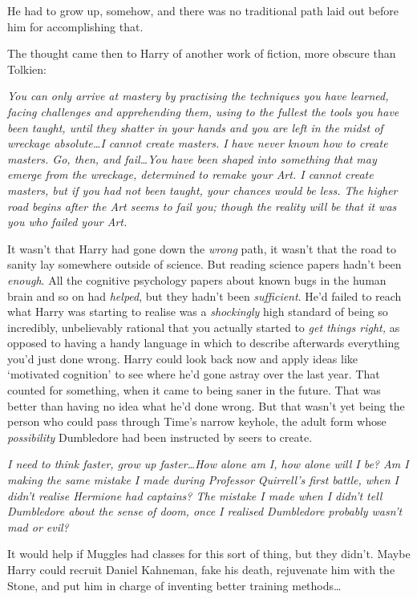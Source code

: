 He had to grow up, somehow, and there was no traditional path laid out before him for accomplishing that.

The thought came then to Harry of another work of fiction, more obscure than Tolkien:

\emph{You can only arrive at mastery by practising the techniques you have learned, facing challenges and apprehending them, using to the fullest the tools you have been taught, until they shatter in your hands and you are left in the midst of wreckage absolute…I cannot create masters. I have never known how to create masters. Go, then, and fail…You have been shaped into something that may emerge from the wreckage, determined to remake your Art. I cannot create masters, but if you had not been taught, your chances would be less. The higher road begins after the Art seems to fail you; though the reality will be that it was you who failed your Art.}

It wasn’t that Harry had gone down the \emph{wrong} path, it wasn’t that the road to sanity lay somewhere outside of science. But reading science papers hadn’t been \emph{enough}. All the cognitive psychology papers about known bugs in the human brain and so on had \emph{helped}, but they hadn’t been \emph{sufficient}. He’d failed to reach what Harry was starting to realise was a \emph{shockingly} high standard of being so incredibly, unbelievably rational that you actually started to \emph{get things right,} as opposed to having a handy language in which to describe afterwards everything you’d just done wrong. Harry could look back now and apply ideas like ‘motivated cognition’ to see where he’d gone astray over the last year. That counted for something, when it came to being saner in the future. That was better than having no idea what he’d done wrong. But that wasn’t yet being the person who could pass through Time’s narrow keyhole, the adult form whose \emph{possibility} Dumbledore had been instructed by seers to create.

\emph{I need to think faster, grow up faster…How alone am I, how alone will I be? Am I making the same mistake I made during Professor Quirrell’s first battle, when I didn’t realise Hermione had captains? The mistake I made when I didn’t tell Dumbledore about the sense of doom, once I realised Dumbledore probably wasn’t mad or evil?}

It would help if Muggles had classes for this sort of thing, but they didn’t. Maybe Harry could recruit Daniel Kahneman, fake his death, rejuvenate him with the Stone, and put him in charge of inventing better training methods…

